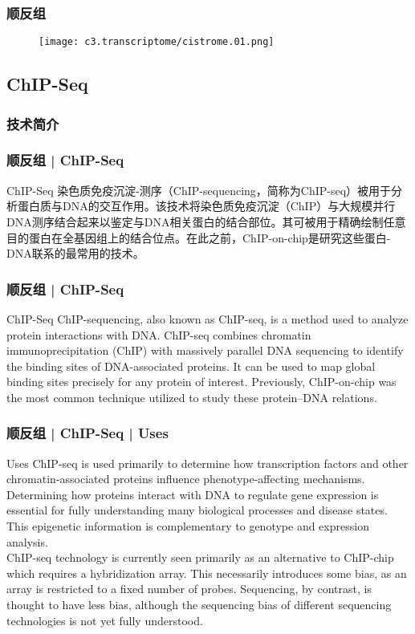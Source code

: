 \begin{frame}
  \frametitle{顺反组}
  \begin{figure}
    \centering
    \texttt{[image: c3.transcriptome/cistrome.01.png]}
  \end{figure}
\end{frame}

\subsection{ChIP-Seq}
\subsubsection{技术简介}
\begin{frame}
  \frametitle{顺反组 | ChIP-Seq}
  \begin{block}{ChIP-Seq}
染色质免疫沉淀-测序（ChIP-sequencing，简称为ChIP-seq）被用于分析蛋白质与DNA的交互作用。该技术将染色质免疫沉淀（ChIP）与大规模并行DNA测序结合起来以鉴定与DNA相关蛋白的结合部位。其可被用于精确绘制任意目的蛋白在全基因组上的结合位点。在此之前，ChIP-on-chip是研究这些蛋白-DNA联系的最常用的技术。
  \end{block}
\end{frame}

\begin{frame}
  \frametitle{顺反组 | ChIP-Seq}
  \begin{block}{ChIP-Seq}
    ChIP-sequencing, also known as ChIP-seq, is a method used to analyze protein interactions with DNA. ChIP-seq combines chromatin immunoprecipitation (ChIP) with massively parallel DNA sequencing to identify the binding sites of DNA-associated proteins. It can be used to map global binding sites precisely for any protein of interest. Previously, ChIP-on-chip was the most common technique utilized to study these protein–DNA relations.
  \end{block}
\end{frame}

\begin{frame}
  \frametitle{顺反组 | ChIP-Seq | Uses}
  \begin{block}{Uses}
    ChIP-seq is used primarily to determine how transcription factors and other chromatin-associated proteins influence phenotype-affecting mechanisms. Determining how proteins interact with DNA to regulate gene expression is essential for fully understanding many biological processes and disease states. This epigenetic information is complementary to genotype and expression analysis.\\
    \vspace{1em}
    ChIP-seq technology is currently seen primarily as an alternative to ChIP-chip which requires a hybridization array. This necessarily introduces some bias, as an array is restricted to a fixed number of probes. Sequencing, by contrast, is thought to have less bias, although the sequencing bias of different sequencing technologies is not yet fully understood.\\
  \end{block}
\end{frame}

